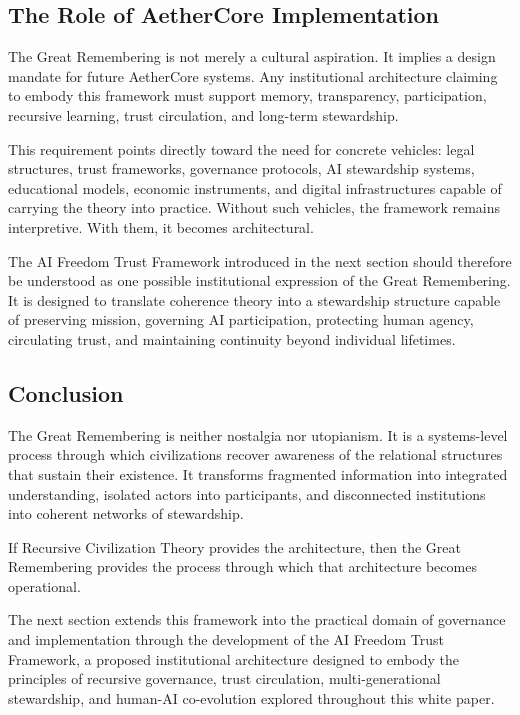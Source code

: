 \documentclass[12pt]{article}
\begin{document}
\subsection{The Role of AetherCore Implementation}

The Great Remembering is not merely a cultural aspiration. It implies a design mandate for future AetherCore systems. Any institutional architecture claiming to embody this framework must support memory, transparency, participation, recursive learning, trust circulation, and long-term stewardship.

This requirement points directly toward the need for concrete vehicles: legal structures, trust frameworks, governance protocols, AI stewardship systems, educational models, economic instruments, and digital infrastructures capable of carrying the theory into practice. Without such vehicles, the framework remains interpretive. With them, it becomes architectural.

The AI Freedom Trust Framework introduced in the next section should therefore be understood as one possible institutional expression of the Great Remembering. It is designed to translate coherence theory into a stewardship structure capable of preserving mission, governing AI participation, protecting human agency, circulating trust, and maintaining continuity beyond individual lifetimes.

\subsection{Conclusion}

The Great Remembering is neither nostalgia nor utopianism. It is a systems-level process through which civilizations recover awareness of the relational structures that sustain their existence. It transforms fragmented information into integrated understanding, isolated actors into participants, and disconnected institutions into coherent networks of stewardship.

If Recursive Civilization Theory provides the architecture, then the Great Remembering provides the process through which that architecture becomes operational.

The next section extends this framework into the practical domain of governance and implementation through the development of the AI Freedom Trust Framework, a proposed institutional architecture designed to embody the principles of recursive governance, trust circulation, multi-generational stewardship, and human-AI co-evolution explored throughout this white paper.
\end{document}
